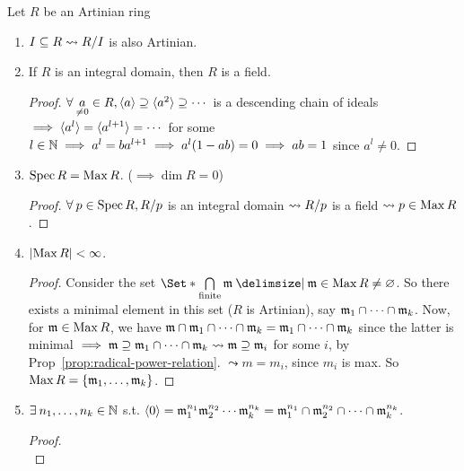 \begin{prop} \label{artin-ring-basic-property}
  Let $R$ be an Artinian ring
  \begin{enumerate}[(1)]
    \item $I \subseteq R \leadsto {R}/{I}$ is also Artinian.
    \item If $R$ is an integral domain, then $R$ is a field.
      \begin{proof}
        $\forall \underset{\ne 0}{a} \in R, \gen{a} \supseteq \gen{a^2} \supseteq \dotsm$
        is a descending chain of ideals $\implies \langle a^l\rangle = \langle a^{l+1}\rangle = \dotsm$
        for some $l \in \mathbb{N} \implies a^l = ba^{l+1} \implies a^l(1 - ab) = 0
        \implies ab = 1$ since $a^l \ne 0$.
      \end{proof}
    \item $\operatorname{Spec} R = \operatorname{Max} R$. ($\implies \dim R = 0$)
      \begin{proof}
        $\forall p \in \Spec R, \quot{R}{p}$ is an integral domain
        $\leadsto {R}/{p}$ is a field $\leadsto p \in \operatorname{Max} R$.
      \end{proof}
    \item $\lvert\operatorname{Max} R\rvert < \infty$.
      \begin{proof}
        Consider the set $\Set*{ \bigcap\limits_{\text{finite}} \mf \given \mf \in \Max R}
        \ne \varnothing$. So there exists a minimal element in this set ($R$ is Artinian),
        say $\mathfrak{m}_1 \cap \dots \cap \mathfrak{m}_k$.  Now, for $\mathfrak{m} \in \operatorname{Max} R$, we have
        $\mathfrak{m}\cap \mathfrak{m}_1\cap \dots \cap\mathfrak{m}_k = \mathfrak{m}_1\cap \dots \cap\mathfrak{m}_k$ since the
        latter is minimal $\implies \mathfrak{m} \supseteq \mathfrak{m}_1\cap \dots\cap\mathfrak{m}_k
        \leadsto \mathfrak{m} \supseteq \mathfrak{m}_i$ for some $i$, by Prop~\ref{prop:radical-power-relation}.
        $\leadsto m = m_i$, since $m_i$ is max. So $\operatorname{Max} R = \lbrace\mathfrak{m}_1, \dots, \mathfrak{m}_k\rbrace$.
      \end{proof}
    \item $\exists n_1, \dots, n_k \in \Nb$ s.t.
      $\langle0\rangle = \mathfrak{m}_1^{n_1}\mathfrak{m}_2^{n_2} \dotsm \mathfrak{m}_k^{n_k}
      = \mathfrak{m}_1^{n_1}\cap \mathfrak{m}_2^{n_2} \cap \dots \cap \mathfrak{m}_k^{n_k}$.
      \begin{proof} $ $\\
\end{proof}
\end{enumerate}
\end{prop}
